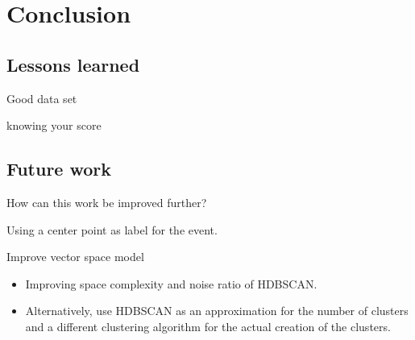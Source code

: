 \section{Conclusion}

\subsection{Lessons learned}
Good data set

knowing your score



\subsection{Future work}

How can this work be improved further?

Using a center point as label for the event.

Improve vector space model

\begin{itemize}
    \item Improving space complexity and noise ratio of HDBSCAN.
    \item Alternatively, use HDBSCAN as an approximation for the number of clusters and a different clustering algorithm
    for the actual creation of the clusters.
\end{itemize}
